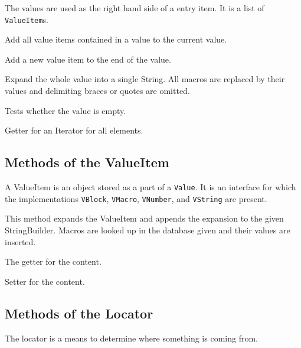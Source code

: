 The values are used as the right hand side of a entry item. It is a list of
\texttt{ValueItem}s.

\begin{methods}
    Add all value items contained in a value to the current value.

    Add a new value item to the end of the value.

    Expand the whole value into a single String. All macros are replaced by
    their values and delimiting braces or quotes are omitted.

    Tests whether the value is empty.

    Getter for an Iterator for all elements.

\end{methods}


\subsection{Methods of the ValueItem}

A ValueItem is an object stored as a part of a \texttt{Value}. It is an
interface for which the implementations \texttt{VBlock}, \texttt{VMacro},
\texttt{VNumber}, and \texttt{VString} are present. 

\begin{methods}

    This method expands the ValueItem and appends the expansion to the given
    StringBuilder. Macros are looked up in the database given and their
    values are inserted.

    The getter for the content.

    Setter for the content.

\end{methods}


\subsection{Methods of the Locator}

The locator is a means to determine where something is coming from.

